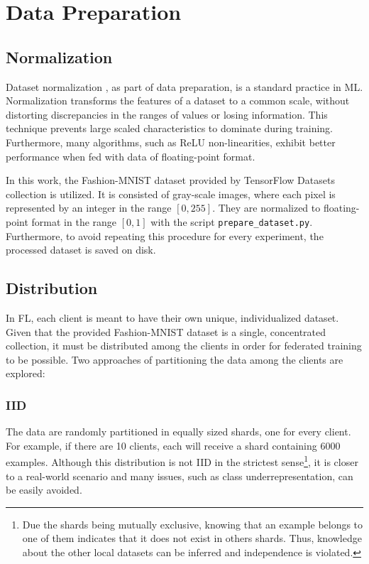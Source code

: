 \section{Data Preparation}
\subsection{Normalization}
Dataset normalization \cite{dataset_norm}, as part of data preparation, is a standard practice in ML. Normalization transforms the features of a dataset to a common scale, without distorting discrepancies in the ranges of values or losing information. This technique prevents large scaled characteristics to dominate during training. Furthermore, many algorithms, such as ReLU non-linearities, exhibit better performance when fed with data of floating-point format.

In this work, the Fashion-MNIST dataset provided by TensorFlow Datasets \cite{TFDS} collection is utilized. It is consisted of gray-scale images, where each pixel is represented by an integer in the range \([0,255]\). They are normalized to floating-point format in the range \([0,1]\) with the script \texttt{prepare\_dataset.py}. Furthermore, to avoid repeating this procedure for every experiment, the processed dataset is saved on disk.

\subsection{Distribution}
In FL, each client is meant to have their own unique, individualized dataset. Given that the provided Fashion-MNIST dataset is a single, concentrated collection, it must be distributed among the clients in order for federated training to be possible. Two approaches of partitioning the data among the clients are explored:

\subsubsection{IID}
The data are randomly partitioned in equally sized shards, one for every client. For example, if there are 10 clients, each will receive a shard containing 6000 examples. Although this distribution is not IID in the strictest sense\footnote{Due the shards being mutually exclusive, knowing that an example belongs to one of them indicates that it does not exist in others shards. Thus, knowledge about the other local datasets can be inferred and independence is violated.}, it is closer to a real-world scenario and many issues, such as class underrepresentation, can be easily avoided.


